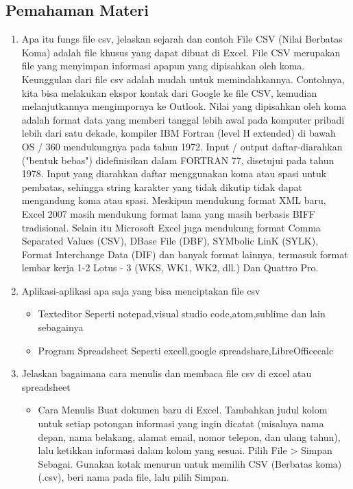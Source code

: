 \subsection{Pemahaman Materi}
\begin{enumerate}
    \item Apa itu fungs file csv, jelaskan sejarah dan contoh
    File CSV (Nilai Berbatas Koma) adalah file khusus yang dapat dibuat di Excel. File CSV merupakan file yang menyimpan informasi apapun yang dipisahkan oleh koma. Keunggulan dari file csv adalah mudah untuk memindahkannya. Contohnya, kita bisa melakukan ekspor kontak dari Google ke file CSV, kemudian melanjutkannya mengimpornya ke Outlook.
    Nilai yang dipisahkan oleh koma adalah format data yang memberi tanggal lebih awal pada komputer pribadi lebih dari satu dekade, kompiler IBM Fortran (level H extended) di bawah OS / 360 mendukungnya pada tahun 1972. Input / output daftar-diarahkan ("bentuk bebas") didefinisikan dalam FORTRAN 77, disetujui pada tahun 1978. Input yang diarahkan daftar menggunakan koma atau spasi untuk pembatas, sehingga string karakter yang tidak dikutip tidak dapat mengandung koma atau spasi.
    Meskipun mendukung format XML baru, Excel 2007 masih mendukung format lama yang masih berbasis BIFF tradisional. Selain itu Microsoft Excel juga mendukung format Comma Separated Values (CSV), DBase File (DBF), SYMbolic LinK (SYLK), Format Interchange Data (DIF) dan banyak format lainnya, termasuk format lembar kerja 1-2 Lotus - 3 (WKS, WK1, WK2, dll.) Dan Quattro Pro.
    \item Aplikasi-aplikasi apa saja yang bisa menciptakan file csv
    \begin{itemize}
        \item Texteditor
        Seperti notepad,visual studio code,atom,sublime dan lain sebagainya
        \item Program Spreadsheet
        Seperti excell,google spreadshare,LibreOfficecalc
    \end{itemize}
    \item Jelaskan bagaimana cara menulis dan membaca file csv di excel atau spreadsheet
    \begin{itemize}
        \item Cara Menulis
        Buat dokumen baru di Excel. Tambahkan judul kolom untuk setiap potongan informasi yang ingin dicatat (misalnya nama depan, nama belakang, alamat email, nomor telepon, dan ulang tahun), lalu ketikkan informasi dalam kolom yang sesuai. Pilih File > Simpan Sebagai. Gunakan kotak menurun untuk memilih CSV (Berbatas koma) (.csv), beri nama pada file, lalu pilih Simpan.

\end{itemize}
\end{enumerate}
